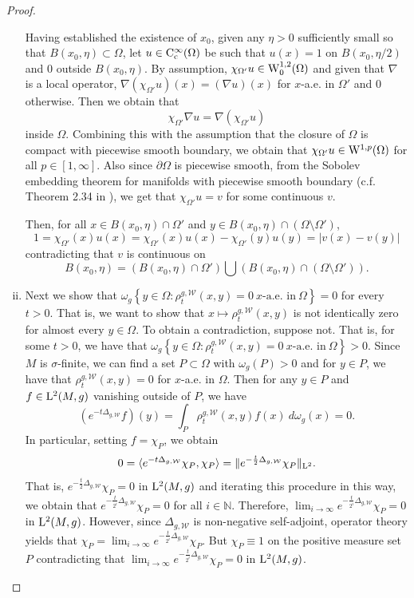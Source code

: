 \documentclass[AMS,STIX1COL]{WileyNJD-v2}
\numberwithin{equation}{section}
\renewcommand{\~}{\tilde}
\renewcommand{\-}{\bar}
\newcommand{\8}{\infty}
\newcommand{\cW}{\mathcal{W}}
\newcommand{\dbrac}[1]{\left\{#1\right\}}
\newcommand{\modulus}[1]{|#1|}
\newcommand{\set}[1]{\dbrac{#1}}
\newcommand{\Na}{\ensuremath{\mathbb{N}}}
\newcommand{\intersect}{\cap}
\newcommand{\norm}[1]{\| #1 \|}			%
\newcommand{\inprod}[1]{\langle #1 \rangle}	%
\newcommand{\Lp}[2][{}]{{\rm L}^{#2}_{\rm #1}}		%
\newcommand{\Ck}[2][{}]{{\rm C}^{#2}_{\rm #1}}		%
\newcommand{\Sob}[2][{}]{{\rm W}^{#2}_{\rm #1}}		%
\newcommand{\SobH}[2][{}]{{\Sob[#1]{#2,2}}}	%
\newcommand{\hk}{\rho}
\begin{document}
\begin{proof}
\begin{enumerate}[(i)]
	Having established the existence of $x_0$, given any $\eta > 0$ sufficiently small so that $B(x_0,\eta) \subset \Omega$, let $u \in \Ck[c]{\infty}(\Omega)$ be such that $u(x) = 1$ on $B(x_0, \eta/2)$ and $0$ outside $B(x_0,\eta)$. By assumption, $\chi_{\Omega'} u \in \SobH[0]{1}(\Omega)$ and  given that $\nabla$ is a local operator, $\nabla (\chi_{\Omega'} u)(x) = (\nabla u)(x)$ for $x$-a.e. in $\Omega'$ and $0$ otherwise. Then we obtain that
	$$\chi_{\Omega'}\nabla u = \nabla(\chi_{\Omega'} u)$$
	inside $\Omega$.
	Combining this with the assumption that the  closure of $\Omega$ is compact with piecewise smooth boundary, we obtain that $\chi_{\Omega'} u \in \Sob{1,p}(\Omega)$ for all $p \in [1,\infty]$. 
	Also since $\partial \Omega$ is piecewise smooth, from the Sobolev embedding theorem for manifolds with piecewise smooth boundary (c.f. Theorem 2.34 in \cite{Aubin}), we get that $\chi_{\Omega'} u = v$ for some continuous $v$.

	
	Then, for all $x \in B(x_0,\eta) \intersect \Omega'$ and $y \in B(x_0,\eta) \intersect (\Omega \setminus \Omega')$, 
	$$1 = \chi_{\Omega'}(x)u(x) = \chi_{\Omega'}(x) u(x) - \chi_{\Omega'}(y)u(y) = \modulus{v(x) - v(y)}$$ 
	contradicting that $v$ is continuous on
        $$B(x_0, \eta) = (B(x_0,\eta) \intersect \Omega') \bigcup (B(x_0,\eta) \intersect (\Omega \setminus \Omega')).$$


\item Next we show that $\omega_g\set{y \in \Omega: \hk^{g,\cW}_{t}(x,y) = 0\ \text{$x$-a.e. in}\ \Omega} = 0$ for every $t>0$. 
	That is, we want to show that $x \mapsto \hk^{g,\cW}_{t}(x,y)$ is not identically zero for almost every $y \in \Omega$.
	To obtain a contradiction, suppose not.
	That is, for some $t > 0$, we have that $\omega_g\set{y \in \Omega: \hk^{g,\cW}_{t}(x,y) = 0\ \text{$x$-a.e. in}\ \Omega} > 0$.
	Since $M$ is $\sigma$-finite, we can find a set $P \subset \Omega$ with $\omega_g(P) > 0$ and for $y \in P$, we have that $\hk^{g,\cW}_t(x,y) = 0$ for $x$-a.e. in $\Omega$. 
	Then for any $y \in P$ and $f \in \Lp{2}(M, g)$ vanishing outside of $P$, we have
	$$ (e^{-t\Delta_{g,\cW}} f)(y) = \int_{P} \hk_t^{g,\cW}(x,y) f(x)\ d\omega_g(x) = 0.$$
	In particular, setting $f = \chi_{P}$, we obtain
	$$ 0 = \inprod{e^{-t\Delta_{g,\cW}} \chi_{P}, \chi_{P}} = \norm{  e^{-\frac{t}{2}\Delta_{g,\cW}} \chi_{P}}_{\Lp{2}}.$$ 
	That is, $e^{-\frac{t}{2}\Delta_{g,\cW}} \chi_P = 0$ in $\Lp{2}(M, g)$ and iterating this procedure in this way, we obtain that
	$ e^{-\frac{t}{2^i}\Delta_{g,\cW}}\chi_P = 0$ for all $i \in \Na$.
	Therefore, $\lim_{i \to \infty} e^{-\frac{t}{2^i}\Delta_{g,\cW}} \chi_P = 0$ in $\Lp{2}(M, g)$.
	However, since $\Delta_{g,\cW}$ is non-negative self-adjoint, operator theory yields that $\chi_P = \lim_{i \to \infty} e^{-\frac{t}{2^i}\Delta_{g,\cW}}\chi_P$.
        But \(\chi_P \equiv 1\) on the positive measure set $P$ contradicting that $\lim_{i \to \infty} e^{-\frac{t}{2^i}\Delta_{g,\cW}}\chi_P = 0$ in $\Lp{2}(M, g)$.
	

\end{enumerate}
\end{proof}
\end{document}
